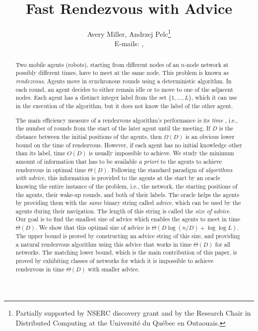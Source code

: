 \documentclass{llncs}
\begin{document}
\title{{\bf Fast Rendezvous with Advice}}
\date{}

\author{
Avery Miller,
Andrzej Pelc\thanks{Partially supported by NSERC discovery grant and by the Research Chair in Distributed Computing at the Universit\'e du Qu\'{e}bec en Outaouais.}\\
E-mails: , \\
}


\date{ }
\maketitle

\begin{abstract}

Two mobile agents (robots), starting from different nodes of an $n$-node network at possibly different times, have to meet at the same node.
This problem is known as {\em rendezvous}.
Agents move in synchronous rounds using a deterministic algorithm.
In each round, an agent decides to either remain
idle or to move to one of the adjacent nodes. 
Each agent has a distinct integer label from the set $\{1,\dots,L\}$, which it can
use in the execution of the algorithm, but it does not know the label of the other agent. 

The main efficiency measure of a rendezvous algorithm's performance is its {\em time} , i.e., the number of rounds from the start of the later agent until the meeting.
If $D$ is the distance between the initial positions of the agents, then $\Omega(D)$ is an obvious lower bound on the time of rendezvous. However, if each agent has no initial  knowledge other than its label,
 time $O(D)$ is usually impossible to achieve. We study the minimum amount of information that has to be available  {\em a priori} to the agents to achieve rendezvous in optimal time $\Theta(D)$.
Following the standard paradigm of {\em algorithms
with advice}, this information is provided to the agents at the start by an oracle knowing the entire instance of the problem, i.e., the network, the starting  positions of the agents, their wake-up rounds,  and both of their labels. The oracle
helps the agents by providing them with the {\em same} binary string called {\em advice}, which can be used by the agents during their navigation. The length of this
string is called the {\em size of advice}.  Our goal is to find the smallest size of advice which enables the agents to meet in time $\Theta(D)$. We show that this optimal size of advice is $\Theta(D\log(n/D)+\log\log L)$. 
The upper bound is proved by constructing an advice string of this size, and providing a natural rendezvous algorithm using this advice that works in time $\Theta(D)$
for all networks.
The matching lower bound, which is the main contribution of this paper, is proved by exhibiting classes of networks for which it is impossible to achieve
rendezvous in time $\Theta(D)$
with smaller advice. 



\end{abstract}
\end{document}
